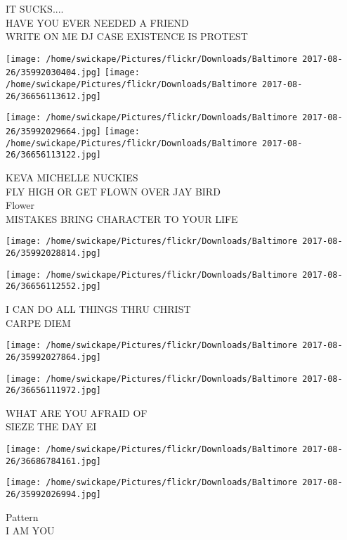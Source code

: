 \documentclass[10pt,letterpaper]{article}
\begin{document}
IT SUCKS....\\
HAVE YOU EVER NEEDED A FRIEND\\
WRITE ON ME DJ CASE EXISTENCE IS PROTEST\\
\pagebreak

\texttt{[image: /home/swickape/Pictures/flickr/Downloads/Baltimore 2017-08-26/35992030404.jpg]}
\texttt{[image: /home/swickape/Pictures/flickr/Downloads/Baltimore 2017-08-26/36656113612.jpg]}

\texttt{[image: /home/swickape/Pictures/flickr/Downloads/Baltimore 2017-08-26/35992029664.jpg]}
\texttt{[image: /home/swickape/Pictures/flickr/Downloads/Baltimore 2017-08-26/36656113122.jpg]}

KEVA MICHELLE NUCKIES\\
FLY HIGH OR GET FLOWN OVER JAY BIRD\\
Flower\\
MISTAKES BRING CHARACTER TO YOUR LIFE\\
\pagebreak

\texttt{[image: /home/swickape/Pictures/flickr/Downloads/Baltimore 2017-08-26/35992028814.jpg]}

\vspace{0.25in}
\texttt{[image: /home/swickape/Pictures/flickr/Downloads/Baltimore 2017-08-26/36656112552.jpg]}

I CAN DO ALL THINGS THRU CHRIST\\
CARPE DIEM\\
\pagebreak

\texttt{[image: /home/swickape/Pictures/flickr/Downloads/Baltimore 2017-08-26/35992027864.jpg]}

\vspace{0.25in}
\texttt{[image: /home/swickape/Pictures/flickr/Downloads/Baltimore 2017-08-26/36656111972.jpg]}

WHAT ARE YOU AFRAID OF\\
SIEZE THE DAY EI\\
\pagebreak

\texttt{[image: /home/swickape/Pictures/flickr/Downloads/Baltimore 2017-08-26/36686784161.jpg]}

\vspace{0.25in}
\texttt{[image: /home/swickape/Pictures/flickr/Downloads/Baltimore 2017-08-26/35992026994.jpg]}

Pattern\\
I AM YOU\\
\pagebreak
\end{document}
